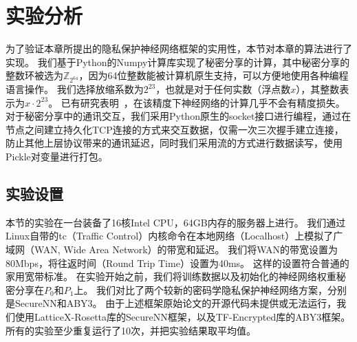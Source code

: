 \section{实验分析}
为了验证本章所提出的隐私保护神经网络框架的实用性，本节对本章的算法进行了实现。
%
我们基于Python的Numpy计算库实现了秘密分享的计算，其中秘密分享的整数环被选为$\mathbb Z_{2^{64}}$，因为64位整数能被计算机原生支持，可以方便地使用各种编程语言操作。
%
我们选择放缩系数为$2^{23}$，也就是对于任何实数（浮点数$x$），其整数表示为$x \cdot 2^{23}$。
已有研究表明~\cite{}，在该精度下神经网络的计算几乎不会有精度损失。
%
对于秘密分享中的通讯交互，我们采用Python原生的socket接口进行编程，通过在节点之间建立持久化TCP连接的方式来交互数据，仅需一次三次握手建立连接，防止其他上层协议带来的通讯延迟，同时我们采用流的方式进行数据读写，使用Pickle对变量进行打包。
%

\subsection{实验设置}
本节的实验在一台装备了16核Intel CPU，64GB内存的服务器上进行。
我们通过Linux自带的tc（Traffic Control）内核命令在本地网络（Localhost）上模拟了广域网（WAN, Wide Area Network）的带宽和延迟。
%
我们将WAN的带宽设置为80Mbps，将往返时间（Round Trip Time）设置为40ms。
%
这样的设置符合普通的家用宽带标准。
%
在实验开始之前，我们将训练数据以及初始化的神经网络权重秘密分享在$P_0$和$P_1$上。
%
我们对比了两个较新的密码学隐私保护神经网络方案，分别是SecureNN和ABY3。
%
由于上述框架原始论文的开源代码未提供或无法运行，我们使用LatticeX-Rosetta库的SecureNN框架，以及TF-Encrypted库的ABY3框架。
%
所有的实验至少重复运行了10次，并把实验结果取平均值。


